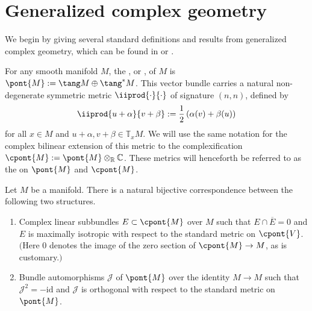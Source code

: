 \section{Generalized complex geometry}\label{section1}

We begin by giving several standard def\/initions and results from generalized complex geometry, which can be found in \cite{gualtieri} or \cite{benbassat}.

For any smooth manifold $M$, the , or , of $M$ is $\pont{M} := \tang M \oplus \tang^* M$.  This vector bundle carries a natural non-degenerate symmetric metric $\iiprod{\cdot}{\cdot}$ of signature $(n,n)$, def\/ined by
\[
  \iiprod{u+\alpha}{v+\beta}
  :=
  \frac{1}{2} \left( \alpha(v) + \beta(u) \right)
\]
for all $x \in M$ and $u+\alpha, v+\beta \in \mathbb{T}_x M$.  We will use the same notation for the complex bilinear extension of this metric to the complexif\/ication $\cpont{M} := \pont{M} \otimes_{\mathbb{R}} \mathbb{C}$.
These metrics will henceforth be referred to as the  on $\pont{M}$ and $\cpont{M}$.


\begin{Proposition} \label{prop4}
Let $M$ be a manifold.
There is a natural bijective correspondence between the following two structures.
  \begin{enumerate}\itemsep=0pt
    \item Complex linear subbundles $E \subset \cpont{M}$ over $M$ such that $E \cap \overline{E} = 0$ and $E$ is maximally isotropic with respect to the standard metric on $\cpont{V}$.  $($Here $0$ denotes the image of the zero section of $\cpont{M} \to M$, as is customary.$)$
    \item Bundle automorphisms $\mathcal{J}$ of $\pont{M}$ over the identity $M \to M$ such that $\mathcal{J}^2 = - \mathrm{id}$ and $\mathcal{J}$ is orthogonal with respect to the standard metric on $\pont{M}$.
  \end{enumerate}
\end{Proposition}


